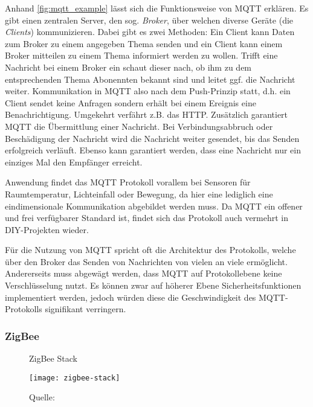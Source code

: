 Anhand \autoref{fig:mqtt_example} lässt sich die Funktionsweise von \ac{MQTT} erklären.
Es gibt einen zentralen Server, den sog. \textit{Broker}, über welchen diverse Geräte (die \textit{Clients}) kommunizieren.
Dabei gibt es zwei Methoden:
Ein Client kann Daten zum Broker zu einem angegeben Thema senden und ein Client kann einem Broker mitteilen zu einem Thema informiert werden zu wollen.
Trifft eine Nachricht bei einem Broker ein schaut dieser nach, ob ihm zu dem entsprechenden Thema Abonennten bekannt sind und leitet ggf. die Nachricht weiter.
Kommunikation in \ac{MQTT} also nach dem Push-Prinzip statt, d.h. ein Client sendet keine Anfragen sondern erhält bei einem Ereignis eine Benachrichtigung.
Umgekehrt verfährt z.B. das \ac{HTTP}.
Zusätzlich garantiert \ac{MQTT} die Übermittlung einer Nachricht.
Bei Verbindungsabbruch oder Beschädigung der Nachricht wird die Nachricht weiter gesendet, bis das Senden erfolgreich verläuft.
Ebenso kann garantiert werden, dass eine Nachricht nur ein einziges Mal den Empfänger erreicht.

Anwendung findet das \ac{MQTT} Protokoll vorallem bei Sensoren für Raumtemperatur, Lichteinfall oder Bewegung, da hier eine lediglich eine eindimensionale Kommunikation abgebildet werden muss.
Da \ac{MQTT} ein offener und frei verfügbarer Standard ist, findet sich das Protokoll auch vermehrt in \ac{DIY}-Projekten wieder.

Für die Nutzung von \ac{MQTT} spricht oft die Architektur des Protokolls, welche über den Broker das Senden von Nachrichten von vielen an viele ermöglicht.
Andererseits muss abgewägt werden, dass \ac{MQTT} auf Protokollebene keine Verschlüsselung nutzt.
Es können zwar auf höherer Ebene Sicherheitsfunktionen implementiert werden, jedoch würden diese die Geschwindigkeit des \ac{MQTT}-Protokolls signifikant verringern.

\subsubsection{ZigBee}

\begin{wrapfigure}{r}{0.4\textwidth}
	\centering
	\caption{ZigBee Stack}
	\texttt{[image: zigbee-stack]}
	\caption*{\footnotesize{Quelle: }}
	\label{fig:zigbee_stack}
\end{wrapfigure}

